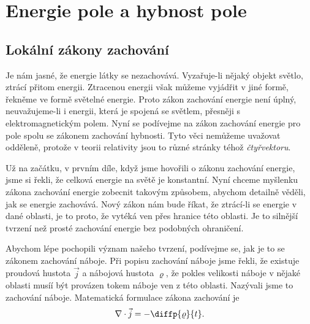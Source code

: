 \setchaptertoc
\chapter{Energie pole a hybnost pole}\label{fyz:IIchapXXVII}
  \section{Lokální zákony zachování}\label{fyz:IIchapXXVIIsecI}
    
    Je nám jasné, že energie látky se nezachovává. Vyzařuje-li nějaký objekt světlo, ztrácí přitom
    energii. Ztracenou energii však můžeme vyjádřit v jiné formě, řekněme ve formě světelné energie.
    Proto zákon zachování energie není úplný, neuvažujeme-li i energii, která je spojená se světlem,
    přesněji s elektromagnetickým polem. Nyní se podívejme na zákon zachování energie pro pole spolu
    se zákonem zachování hybnosti. Tyto věci nemůžeme uvažovat odděleně, protože v teorii relativity
    jsou to různé stránky téhož \emph{čtyřvektoru}.
    
    Už na začátku, v prvním díle, když jsme hovořili o zákonu zachování energie, jsme si řekli, že
    celková energie na světě je konstantní. Nyní chceme myšlenku zákona zachování energie zobecnit
    takovým způsobem, abychom detailně věděli, jak se energie zachovává. Nový zákon nám bude říkat,
    že ztrácí-li se energie v dané oblasti, je to proto, že vytéká ven přes hranice této oblasti. Je
    to silnější tvrzení než prosté zachování energie bez podobných ohraničení.
    
    Abychom lépe pochopili význam našeho tvrzení, podívejme se, jak je to se zákonem zachování
    náboje. Při popisu zachování náboje jsme řekli, že existuje proudová hustota \(\vec{j}\) a
    nábojová hustota \(\varrho\), že pokles velikosti náboje v nějaké oblasti musíí být provázen
    tokem náboje ven z této oblasti. Nazývali jsme to zachování náboje. Matematická formulace zákona
    zachování je
    \begin{equation}\label{fyz:eq958}
      \nabla\cdot\vec{j}=-\diffp{\varrho}{t}.
    \end{equation}
    
